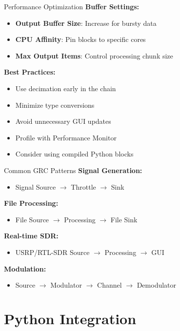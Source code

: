 \documentclass[aspectratio=169,11pt]{beamer}
\begin{document}
\begin{frame}{Performance Optimization}
\textbf{Buffer Settings:}
\begin{itemize}
    \item \textbf{Output Buffer Size}: Increase for bursty data
    \item \textbf{CPU Affinity}: Pin blocks to specific cores
    \item \textbf{Max Output Items}: Control processing chunk size
\end{itemize}

\textbf{Best Practices:}
\begin{itemize}
    \item Use decimation early in the chain
    \item Minimize type conversions
    \item Avoid unnecessary GUI updates
    \item Profile with Performance Monitor
    \item Consider using compiled Python blocks
\end{itemize}
\end{frame}

\begin{frame}{Common GRC Patterns}
\textbf{Signal Generation:}
\begin{itemize}
    \item Signal Source $\rightarrow$ Throttle $\rightarrow$ Sink
\end{itemize}

\textbf{File Processing:}
\begin{itemize}
    \item File Source $\rightarrow$ Processing $\rightarrow$ File Sink
\end{itemize}

\textbf{Real-time SDR:}
\begin{itemize}
    \item USRP/RTL-SDR Source $\rightarrow$ Processing $\rightarrow$ GUI
\end{itemize}

\textbf{Modulation:}
\begin{itemize}
    \item Source $\rightarrow$ Modulator $\rightarrow$ Channel $\rightarrow$ Demodulator
\end{itemize}
\end{frame}


\section{Python Integration}
\end{document}
